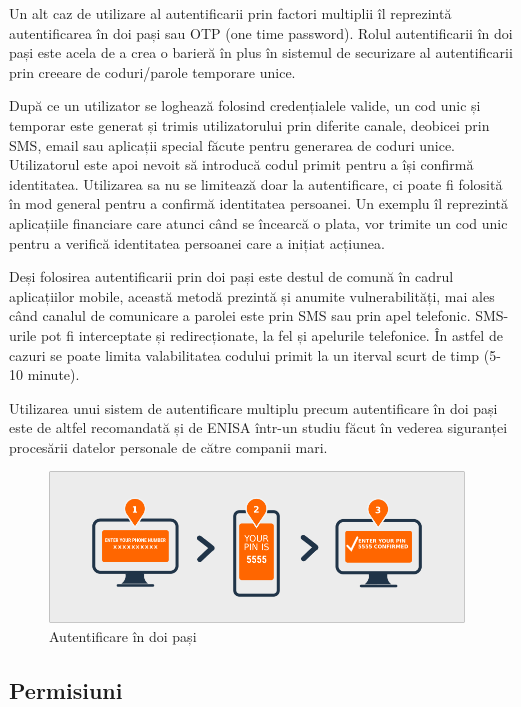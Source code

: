 \documentclass[12pt]{article}
\begin{document}
Un alt caz de utilizare al autentificarii prin factori multiplii îl reprezintă autentificarea în doi pași
sau OTP (one time password). Rolul autentificarii în doi pași este acela de a crea o barieră în plus
în sistemul de securizare al autentificarii prin creeare de coduri/parole temporare unice.

După ce un utilizator se loghează folosind credențialele valide, un cod unic și temporar este generat
și trimis utilizatorului prin diferite canale, deobicei prin SMS, email sau aplicații special făcute
pentru generarea de coduri unice. Utilizatorul este apoi nevoit să introducă codul primit pentru
a își confirmă identitatea. Utilizarea sa nu se limitează doar la autentificare, ci poate fi folosită în
mod general pentru a confirmă identitatea persoanei. Un exemplu îl reprezintă aplicațiile financiare care
atunci când se încearcă o plata, vor trimite un cod unic pentru a verifică identitatea persoanei care 
a inițiat acțiunea.

Deși folosirea autentificarii prin doi pași este destul de comună în cadrul aplicațiilor mobile, această metodă
prezintă și anumite vulnerabilități, mai ales când canalul de comunicare a parolei este prin SMS sau prin 
apel telefonic.
SMS-urile pot fi interceptate și redirecționate, la fel și apelurile telefonice. În astfel de cazuri
se poate limita valabilitatea codului primit la un iterval scurt de timp (5-10 minute). 

Utilizarea unui sistem de autentificare multiplu precum autentificare în doi pași este de altfel recomandată
și de ENISA \cite{enisa-security-data-processing} într-un studiu făcut în vederea 
siguranței procesării datelor personale de către companii mari.

\begin{figure}[H]
\centering
\includegraphics[height=4cm]{wordpress-two-factor-authentication.png}
\caption{Autentificare în doi pași}
\end{figure}

\subsection{Permisiuni}
\end{document}
